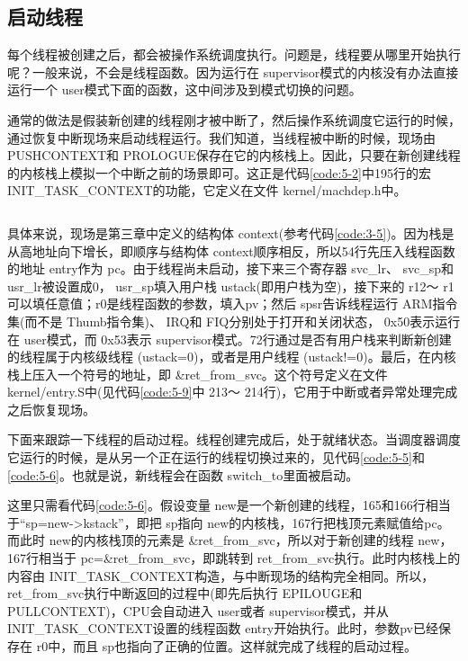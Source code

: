 \documentclass[main.tex]{subfiles}
\begin{document}
\begin{CJK*}{UTF8}{song}
\section{启动线程}
\label{section:start-thread}
每个线程被创建之后，都会被操作系统调度执行。问题是，线程要从哪里开始执行呢？一般来说，不会是线程函数。因为运行在 supervisor模式的内核没有办法直接运行一个 user模式下面的函数，这中间涉及到模式切换的问题。

\par
通常的做法是假装新创建的线程刚才被中断了，然后操作系统调度它运行的时候，通过恢复中断现场来启动线程运行。我们知道，当线程被中断的时候，现场由 PUSH\-CONTEXT和 PRO\-LOGUE保存在它的内核栈上。因此，只要在新创建线程的内核栈上模拟一个中断之前的场景即可。这正是代码\ref{code:5-2}中195行的宏 INIT\_\-TASK\_\-CONTEXT的功能，它定义在文件 kernel\-/\-machdep.h中。

\begin{code}
\label{code:5-10}
\inputminted[firstline=47,lastline=73,linenos,numbersep=5pt,frame=lines,framesep=2mm]{c}{src/chapter05/kernel/machdep.h}
\end{code}

具体来说，现场是第三章中定义的结构体 context(参考代码\ref{code:3-5})。因为栈是从高地址向下增长，即顺序与结构体 context顺序相反，所以54行先压入线程函数的地址 entry作为 pc。由于线程尚未启动，接下来三个寄存器 svc\_\-lr、 svc\_\-sp和 usr\_\-lr被设置成0， usr\_\-sp填入用户栈 ustack(即用户栈为空)，接下来的 r12～ r1可以填任意值；r0是线程函数的参数，填入pv；然后 spsr告诉线程运行 ARM指令集(而不是 Thumb指令集)、 IRQ和 FIQ分别处于打开和关闭状态， 0x50表示运行在 user模式，而 0x53表示  supervisor模式。72行通过是否有用户栈来判断新创建的线程属于内核级线程 (ustack=0)，或者是用户线程 (ustack!=0)。最后，在内核栈上压入一个符号的地址，即  \&ret\_\-from\_\-svc。这个符号定义在文件  kernel\-/\-entry.S中(见代码\ref{code:5-9}中 213～ 214行)，它用于中断或者异常处理完成之后恢复现场。

\par
下面来跟踪一下线程的启动过程。线程创建完成后，处于就绪状态。当调度器调度它运行的时候，是从另一个正在运行的线程切换过来的，见代码\ref{code:5-5}和\ref{code:5-6}。也就是说，新线程会在函数 switch\_\-to里面被启动。

\par
这里只需看代码\ref{code:5-6}。假设变量 new是一个新创建的线程，165和166行相当于“sp=new-\textgreater kstack”，即把 sp指向 new的内核栈，167行把栈顶元素赋值给pc。而此时 new的内核栈顶的元素是  \&ret\_\-from\_\-svc，所以对于新创建的线程 new，167行相当于 pc=\&ret\_\-from\_\-svc，即跳转到 ret\_\-from\_\-svc执行。此时内核栈上的内容由  INIT\_\-TASK\_\-CONTEXT构造，与中断现场的结构完全相同。所以，  ret\_\-from\_\-svc执行中断返回的过程中(即先后执行 EPILOUGE和  PULL\-CONTEXT)，CPU会自动进入 user或者 supervisor模式，并从  INIT\_\-TASK\_\-CONTEXT设置的线程函数  entry开始执行。此时，参数pv已经保存在 r0中，而且 sp也指向了正确的位置。这样就完成了线程的启动过程。


\end{CJK*}
\end{document}
